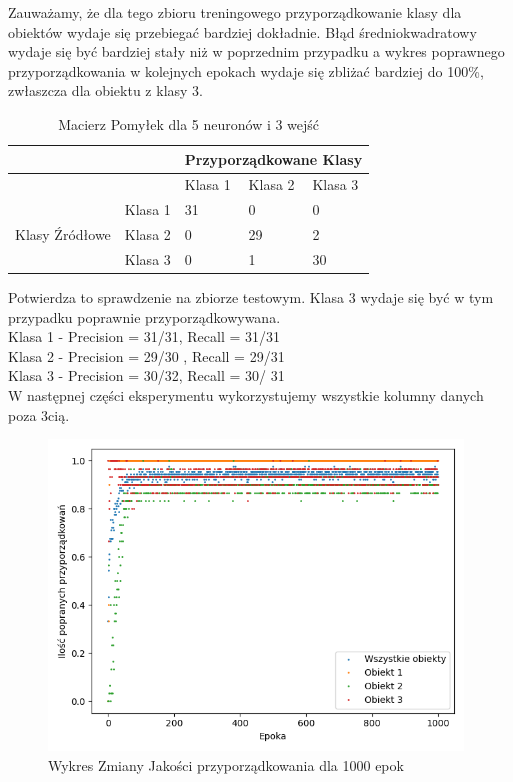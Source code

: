\documentclass[12pt]{article}
\begin{document}
Zauważamy, że dla tego zbioru treningowego przyporządkowanie klasy dla obiektów wydaje się przebiegać bardziej dokładnie. Błąd średniokwadratowy wydaje się być bardziej stały niż w poprzednim przypadku a wykres poprawnego przyporządkowania w kolejnych epokach wydaje się zbliżać bardziej do 100\%, zwłaszcza dla obiektu z klasy 3.

\newpage

\begin{table}
\caption{\label{tab:tablica5} Macierz Pomyłek dla 5 neuronów i 3 wejść }
\begin{tabular}{ |p{3cm}|p{3cm}|p{2cm}|p{2cm}|p{2cm}|  }
 \hline
 & & 
 \multicolumn{3}{|c|}{Przyporządkowane Klasy} \\
 \hline

   & & Klasa 1 & Klasa 2 & Klasa 3\\
 \hline
\multirow{3}{4em}{Klasy Źródłowe}
   & Klasa 1 & 31 & 0 & 0 \\ 
   & Klasa 2 & 0 & 29 & 2 \\
   & Klasa 3 & 0 & 1 & 30 \\

 \hline
\end{tabular}
\end{table}

Potwierdza to sprawdzenie na zbiorze testowym. Klasa 3 wydaje się być w tym przypadku poprawnie przyporządkowywana.
\\Klasa 1 - Precision = 31/31, Recall = 31/31\\
Klasa 2 - Precision = 29/30 , Recall = 29/31\\
Klasa 3 - Precision = 30/32, Recall = 30/ 31\\
W następnej części eksperymentu wykorzystujemy wszystkie kolumny danych poza 3cią.
\newpage

\begin{figure}[!ht]
 \centering
 \includegraphics[width=11cm]{WykresPrzyporzadkowania5neuron3wejscia3.png}
 \caption{Wykres Zmiany Jakości przyporządkowania dla 1000 epok}
 \vspace{-0.1cm}
 \label{WykresPrzyp7}
\end{figure}
\end{document}
